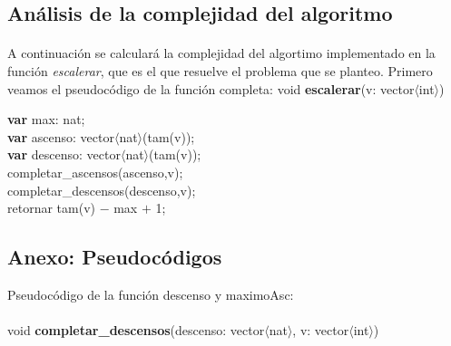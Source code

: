 \subsection{Análisis de la complejidad del algoritmo}

\paragraph{}
A continuación se calculará la complejidad del algortimo implementado en la función \textit{escalerar}, que es el que resuelve el problema que se planteo. Primero veamos el pseudocódigo de la función completa:
\vspace*{30pt}
void \textbf{escalerar}(v: vector$\langle$int$\rangle$)\\
	\begin{algorithm}[H]
\BlankLine		
      \textbf{var} max: nat;\\
      \textbf{var} ascenso: vector$\langle$nat$\rangle$(tam(v));\\
      \textbf{var} descenso: vector$\langle$nat$\rangle$(tam(v));\\
\BlankLine		
      completar\_ascensos(ascenso,v);\\
      completar\_descensos(descenso,v);\\	
\BlankLine		
\BlankLine		
	retornar  tam(v) $-$ max $+$ 1;\\



\end{algorithm}




\subsection{Anexo: Pseudocódigos}
\label{pseudocodigos1}


\vspace*{1cm}
Pseudocódigo de la función descenso y maximoAsc:
\\
\\

void \textbf{completar\_descensos}(descenso: vector$\langle$nat$\rangle$, v: vector$\langle$int$\rangle$)\\
	\begin{algorithm}[H]
\BlankLine		
  \end{algorithm}

